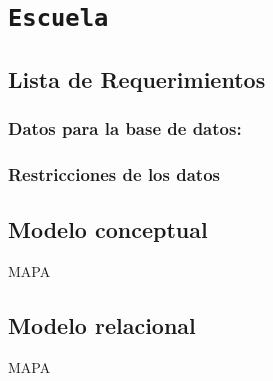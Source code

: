 \section{\texttt{Escuela}}

\subsection{Lista de Requerimientos}


\subsubsection*{Datos para la base de datos:}




\subsubsection*{Restricciones de los datos}


\subsection{Modelo conceptual}
\begin{center}
    MAPA
\end{center}


\subsection{Modelo relacional}
\begin{center}
    MAPA
\end{center}



